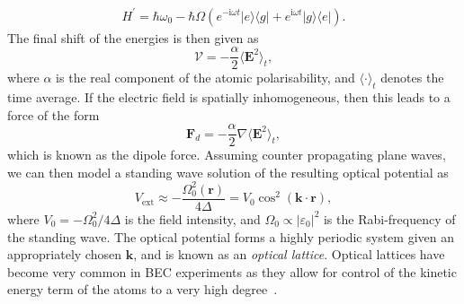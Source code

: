 \begin{align}
 H^{'} = \hbar\omega_0 - \hbar\Omega\left(e^{-\textrm{i}\omega t}|e\rangle\langle g|   + e^{\textrm{i}\omega t}|g\rangle\langle e|  \right).
\end{align}
The final shift of the energies is then given as
\begin{equation}\label{eqn:acshift}
\mathcal{V} = -\frac{\alpha}{2}\langle \mathbf{E}^2\rangle_t ,
\end{equation}
where $\alpha$ is the real component of the atomic polarisability, and $\langle \cdot \rangle_t$ denotes the time average. If the electric field is spatially inhomogeneous, then this leads to a force of the form
\begin{equation}
\mathbf{F}_d = -\frac{\alpha}{2}\nabla\langle \mathbf{E}^2 \rangle_t ,
\end{equation}
which is known as the dipole force. Assuming counter propagating plane waves, we can then model a standing wave solution of the resulting optical potential as
\begin{equation}
    V_{\textrm{ext}} \approx -\frac{\Omega_0^2(\mathbf{r})}{4\Delta}  = V_0 \cos^2 (\mathbf{k} \cdot \mathbf{r}),
\end{equation}
where $V_0 = -\Omega_0^2/4\Delta$ is the field intensity, and $\Omega_0 \propto |\varepsilon_0|^2$ is the Rabi-frequency of the standing wave. The optical potential forms a highly periodic system given an appropriately chosen $\mathbf{k}$, and is known as an \textit{optical lattice}. Optical lattices have become very common in BEC experiments as they allow for control of the kinetic energy term of the atoms to a very high degree~\cite{OL:Greiner_nat_2002,OL:Reijnders_prl_2004,OL:Sorensen_prl_2005,Vtx:Tung_prl_2006,Vtx:Vignolo_pra_2007,BEC:Watanabe_entropy_2016}.

